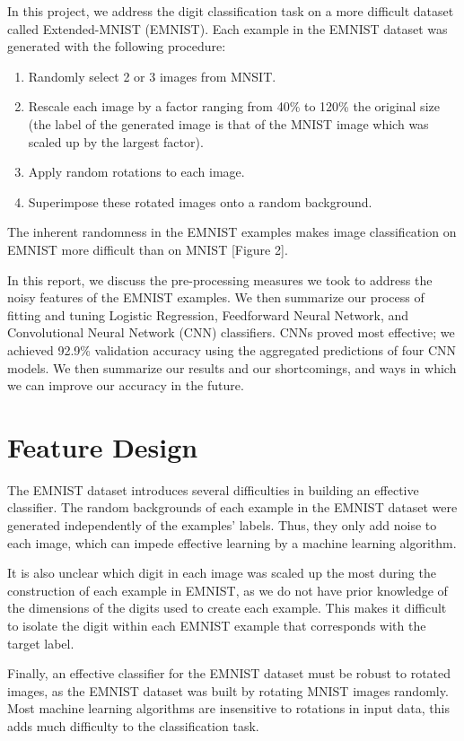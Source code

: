 \documentclass[letterpaper, 10 pt, conference]{ieeeconf}  %
\begin{document}
In this project, we address the digit classification task on a more difficult dataset called Extended-MNIST (EMNIST). Each example in the EMNIST dataset was generated with the following procedure:
\begin{enumerate}
\item Randomly select 2 or 3 images from MNSIT.
\item Rescale each image by a factor ranging from 40\% to 120\% the original size (the label of the generated image is that of the MNIST image which was scaled up by the largest factor).
\item Apply random rotations to each image. 
\item Superimpose these rotated images onto a random background.
\end{enumerate}

The inherent randomness in the EMNIST examples makes image classification on EMNIST more difficult than on MNIST [Figure 2]. 

In this report, we discuss the pre-processing measures we took to address the noisy features of the EMNIST examples. We then summarize our process of fitting and tuning Logistic Regression, Feedforward Neural Network, and Convolutional Neural Network (CNN) classifiers. CNNs proved most effective; we achieved 92.9\% validation accuracy using the aggregated predictions of four CNN models. We then summarize our results and our shortcomings, and ways in which we can improve our accuracy in the future. 

\section{Feature Design}

The EMNIST dataset introduces several difficulties in building an effective classifier. The random backgrounds of each example in the EMNIST dataset were generated independently of the examples' labels. Thus, they only add noise to each image, which can impede effective learning by a machine learning algorithm. 

It is also unclear which digit in each image was scaled up the most during the construction of each example in EMNIST, as we do not have prior knowledge of the dimensions of the digits used to create each example. This makes it difficult to isolate the digit within each EMNIST example that corresponds with the target label.

Finally, an effective classifier for the EMNIST dataset must be robust to rotated images, as the EMNIST dataset was built by rotating MNIST images randomly. Most machine learning algorithms are insensitive to rotations in input data, this adds much difficulty to the classification task.
\end{document}
